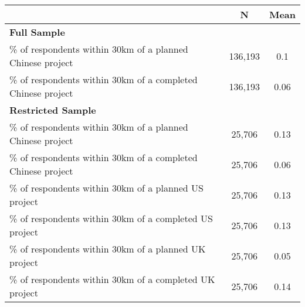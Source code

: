  \begin{tabular}{l cc} 
 & N & Mean \\ 
 \hline  {\bf Full Sample} & & \\ 
 \% of respondents within 30km of a planned Chinese project  &  136,193  &  0.1  \\ \% of respondents within 30km of a completed Chinese project  &  136,193  &  0.06  \\  {\bf Restricted Sample} & & \\ 
 \% of respondents within 30km of a planned Chinese project  &  25,706  &  0.13  \\ \% of respondents within 30km of a completed Chinese project  &  25,706  &  0.06  \\ \% of respondents within 30km of a planned US project  &  25,706  &  0.13  \\ \% of respondents within 30km of a completed US project  &  25,706  &  0.13  \\ \% of respondents within 30km of a planned UK project  &  25,706  &  0.05  \\ \% of respondents within 30km of a completed UK project  &  25,706  &  0.14  \\ \hline  \end{tabular}